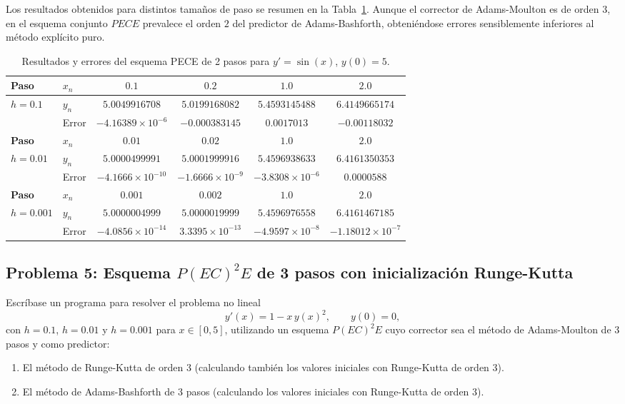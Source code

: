 Los resultados obtenidos para distintos tamaños de paso se resumen en la Tabla~\ref{tab:prob2_pece}. Aunque el corrector de Adams-Moulton es de orden $3$, en el esquema conjunto $PECE$ prevalece el orden $2$ del predictor de Adams-Bashforth, obteniéndose errores sensiblemente inferiores al método explícito puro.

\begin{table}[htbp]
    \centering
    \caption{Resultados y errores del esquema PECE de 2 pasos para $y' = \sin(x)$, $y(0) = 5$.}
    \label{tab:prob2_pece}
    \renewcommand{\arraystretch}{1.25}
    \small
    \begin{tabular}{llcccc}
        \toprule
        \textbf{Paso} & $x_n$ & $0.1$ & $0.2$ & $1.0$ & $2.0$ \\
        \midrule
        $h = 0.1$ & $y_n$ & $5.0049916708$ & $5.0199168082$ & $5.4593145488$ & $6.4149665174$ \\
                  & Error & $-4.16389 \times 10^{-6}$ & $-0.000383145$ & $0.0017013$ & $-0.00118032$ \\
        \midrule
        \textbf{Paso} & $x_n$ & $0.01$ & $0.02$ & $1.0$ & $2.0$ \\
        \midrule
        $h = 0.01$ & $y_n$ & $5.0000499991$ & $5.0001999916$ & $5.4596938633$ & $6.4161350353$ \\
                   & Error & $-4.1666 \times 10^{-10}$ & $-1.6666 \times 10^{-9}$ & $-3.8308 \times 10^{-6}$ & $0.0000588$ \\
        \midrule
        \textbf{Paso} & $x_n$ & $0.001$ & $0.002$ & $1.0$ & $2.0$ \\
        \midrule
        $h = 0.001$ & $y_n$ & $5.0000004999$ & $5.0000019999$ & $5.4596976558$ & $6.4161467185$ \\
                    & Error & $-4.0856 \times 10^{-14}$ & $3.3395 \times 10^{-13}$ & $-4.9597 \times 10^{-8}$ & $-1.18012 \times 10^{-7}$ \\
        \bottomrule
    \end{tabular}
\end{table}

\subsection*{Problema 5: Esquema $P(EC)^2 E$ de 3 pasos con inicialización Runge-Kutta}

Escríbase un programa para resolver el problema no lineal
\begin{equation*}
    y'(x) = 1 - x\,y(x)^2, \qquad y(0) = 0,
    \tag{3.8.4}
\end{equation*}
con $h = 0.1$, $h = 0.01$ y $h = 0.001$ para $x \in [0, 5]$, utilizando un esquema $P(EC)^2 E$ cuyo corrector sea el método de Adams-Moulton de 3 pasos y como predictor:
\begin{enumerate}
    \item El método de Runge-Kutta de orden 3 (calculando también los valores iniciales con Runge-Kutta de orden 3).
    \item El método de Adams-Bashforth de 3 pasos (calculando los valores iniciales con Runge-Kutta de orden 3).
\end{enumerate}


